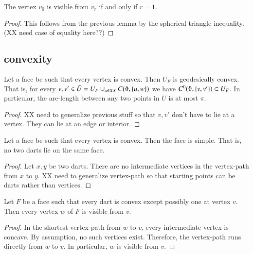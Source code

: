 \begin{lemma}  The vertex $v_0$ is visible from $v_r$ if and
only if $r=1$.
\end{lemma}

\begin{proof}  This follows from the previous lemma by the spherical triangle inequality.
(XX need case of equality here??)
\end{proof}

\subsection{convexity}


\begin{lemma}  Let a face be such that every vertex is convex.  Then $U_F$ is
geodesically convex.  That is, for every $v,v'\in \bar U = U_F\cup_{x\in XX} C(\orgn,\{u,w\})$
we have $C^0(\orgn,\{v,v'\})\subset U_F$.  In particular, the arc-length between any
two points in $\bar U$ is at most $\pi$. 
\end{lemma}

\begin{proof}
XX need to generalize previous stuff so that $v,v'$ don't have to lie at a vertex.
They can lie at an edge or interior.
\end{proof}

\begin{lemma} Let a face be such that every vertex is convex.  Then the face
is simple.  That is, no two darts lie on the same face.
\end{lemma}

\begin{proof} Let $x,y$ be two darts.
There are no intermediate vertices in the vertex-path from $x$ to $y$.
XX need to generalize vertex-path so that starting points can be darts rather than
vertices.
\end{proof}

\begin{lemma}\label{lemma:details}
Let $F$ be a face such that every dart is convex except possibly one
at vertex $v$.  Then  every vertex $w$ of $F$ is visible from $v$.
\end{lemma}

\begin{proof}  In the shortest vertex-path from $w$ to $v$, every intermediate
vertex is concave.  By assumption, no such vertices exist.  Therefore,
the vertex-path runs directly from $w$ to $v$.  In particular,
$w$ is visible from $v$.
\end{proof}

